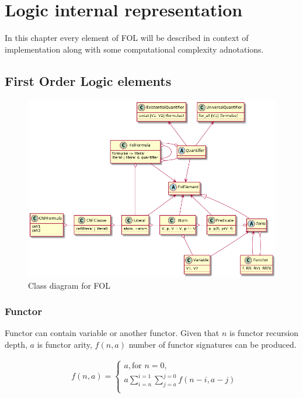 \chapter{Logic internal representation}
\label{chap:LogicInternalRepresentation}

In this chapter every element of \gls{FOL} will be described in context of implementation along with some computational complexity adnotations.

\section{First Order Logic elements}

\begin{figure}[H]
\begin{centering}
  \includegraphics[width=\textwidth]{logic-formula-generator/fol/fol_elements.png}
  \caption{Class diagram for FOL}
\end{centering}
\end{figure}

\subsection{Functor}

Functor can contain variable or another functor.
Given that
$n$ is functor recursion depth,
$a$ is functor arity,
$f(n, a)$ number of functor signatures can be produced.

\begin{align}
	&f(n, a) =
	\begin{cases}
		a, \text{for } n = 0, \\
		a \sum_{i=n}^{i=1} \sum_{j=a}^{j=0} f(n-i,a-j) \\
	\end{cases}
\end{align}

